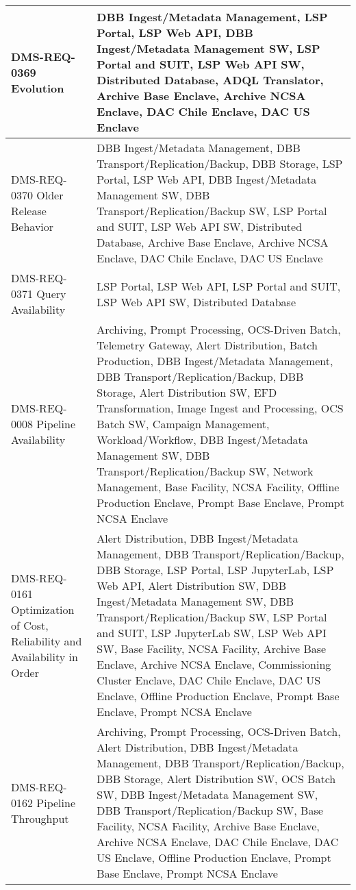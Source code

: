 \begin{longtable}{p{}p{}}
DMS-REQ-0369 Evolution & DBB Ingest/Metadata Management, LSP Portal, LSP Web API, DBB Ingest/Metadata Management SW, LSP Portal and SUIT, LSP Web API SW, Distributed Database, ADQL Translator, Archive Base Enclave, Archive NCSA Enclave, DAC Chile Enclave, DAC US Enclave \\ \hline
DMS-REQ-0370 Older Release Behavior & DBB Ingest/Metadata Management, DBB Transport/Replication/Backup, DBB Storage, LSP Portal, LSP Web API, DBB Ingest/Metadata Management SW, DBB Transport/Replication/Backup SW, LSP Portal and SUIT, LSP Web API SW, Distributed Database, Archive Base Enclave, Archive NCSA Enclave, DAC Chile Enclave, DAC US Enclave \\ \hline
DMS-REQ-0371 Query Availability & LSP Portal, LSP Web API, LSP Portal and SUIT, LSP Web API SW, Distributed Database \\ \hline
DMS-REQ-0008 Pipeline Availability & Archiving, Prompt Processing, OCS-Driven Batch, Telemetry Gateway, Alert Distribution, Batch Production, DBB Ingest/Metadata Management, DBB Transport/Replication/Backup, DBB Storage, Alert Distribution SW, EFD Transformation, Image Ingest and Processing, OCS Batch SW, Campaign Management, Workload/Workflow, DBB Ingest/Metadata Management SW, DBB Transport/Replication/Backup SW, Network Management, Base Facility, NCSA Facility, Offline Production Enclave, Prompt Base Enclave, Prompt NCSA Enclave \\ \hline
DMS-REQ-0161 Optimization of Cost, Reliability and Availability in Order & Alert Distribution, DBB Ingest/Metadata Management, DBB Transport/Replication/Backup, DBB Storage, LSP Portal, LSP JupyterLab, LSP Web API, Alert Distribution SW, DBB Ingest/Metadata Management SW, DBB Transport/Replication/Backup SW, LSP Portal and SUIT, LSP JupyterLab SW, LSP Web API SW, Base Facility, NCSA Facility, Archive Base Enclave, Archive NCSA Enclave, Commissioning Cluster Enclave, DAC Chile Enclave, DAC US Enclave, Offline Production Enclave, Prompt Base Enclave, Prompt NCSA Enclave \\ \hline
DMS-REQ-0162 Pipeline Throughput & Archiving, Prompt Processing, OCS-Driven Batch, Alert Distribution, DBB Ingest/Metadata Management, DBB Transport/Replication/Backup, DBB Storage, Alert Distribution SW, OCS Batch SW, DBB Ingest/Metadata Management SW, DBB Transport/Replication/Backup SW, Base Facility, NCSA Facility, Archive Base Enclave, Archive NCSA Enclave, DAC Chile Enclave, DAC US Enclave, Offline Production Enclave, Prompt Base Enclave, Prompt NCSA Enclave \\ \hline

\end{longtable}
